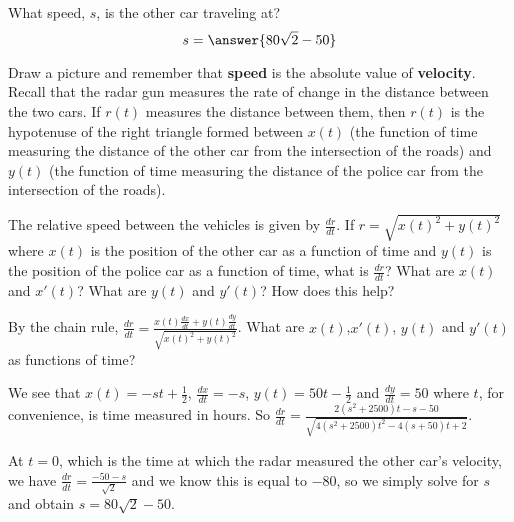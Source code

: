 \documentclass{ximera}
\begin{document}
\begin{exercise}
What speed, $s$, is the other car traveling at?
\[
s=\answer{80\sqrt{2}-50}
\]
\begin{hint}
Draw a picture and remember that \textbf{speed} is the absolute value of \textbf{velocity}. Recall that the radar gun measures the rate of change in the distance between the two cars. If $r(t)$ measures the distance between them, then $r(t)$ is the hypotenuse of the right triangle formed between $x(t)$ (the function of time measuring the distance of the other car from the intersection of the roads) and $y(t)$ (the function of time measuring the distance of the police car from the intersection of the roads). 
\end{hint}
\begin{hint}
The relative speed between the vehicles is given by $\frac{dr}{dt}$. If $r=\sqrt{x(t)^2+y(t)^2}$ where $x(t)$ is the position of the other car as a function of time and $y(t)$ is the position of the police car as a function of time, what is $\frac{dr}{dt}$? What are $x(t)$ and $x'(t)$? What are $y(t)$ and $y'(t)$? How does this help? 
\end{hint}
\begin{hint}
By the chain rule, $\frac{dr}{dt}=\frac{x(t)\frac{dx}{dt}+y(t)\frac{dy}{dt}}{\sqrt{x(t)^2+y(t)^2}}$. What are $x(t)$,$x'(t)$, $y(t)$ and $y'(t)$ as functions of time?
\end{hint}
\begin{hint}
We see that $x(t)=-st+\frac{1}{2}$, $\frac{dx}{dt}=-s$, $y(t)=50t-\frac{1}{2}$ and $\frac{dy}{dt}=50$ where $t$, for convenience, is time measured in hours. So $\frac{dr}{dt}=\frac{2(s^2+2500) t-s-50}{\sqrt{4(s^2+2500) t^2-4 (s+50) t+2}}$.
\end{hint}
\begin{hint}
At $t=0$, which is the time at which the radar measured the other car's velocity, we have $\frac{dr}{dt}=\frac{-50-s}{\sqrt{2}}$ and we know this is equal to $-80$, so we simply solve for $s$ and obtain $s=80\sqrt{2}-50$.\\


\end{hint}
\end{exercise}
\end{document}
